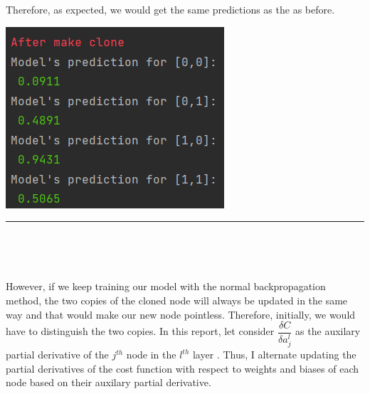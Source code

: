 \documentclass[12pt,english,]{article}
\let\origfigure\figure
\let\endorigfigure\endfigure
\renewenvironment{figure}[1][2] {
    \expandafter\origfigure\expandafter[H]
} {
    \endorigfigure
}
\begin{document}
Therefore, as expected, we would get the same predictions as the as before.

\begin{figure}

{\centering \includegraphics[width=0.7\linewidth]{images/initial_clone_pred} 

}

\caption{\label{fig4:figs}The prediction of the model after cloning a node.}\label{fig:unnamed-chunk-4}
\end{figure}

\hrule

~

~

However, if we keep training our model with the normal backpropagation method, the two copies of the cloned node will always be updated in the same way and that would make our new node pointless. Therefore, initially, we would have to distinguish the two copies. In this report, let consider $\dfrac{\delta C}{\delta a_{j}^{l}}$ as the auxilary partial derivative of the $j^{th}$ node in the $l^{th}$ layer . Thus, I alternate updating the partial derivatives of the cost function with respect to weights and biases of each node based on their auxilary partial derivative. 
\end{document}
